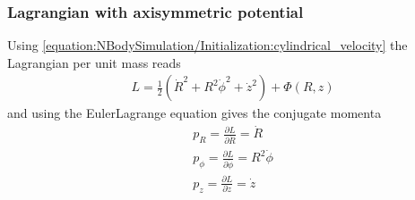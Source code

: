 \documentclass[letterpaper,10pt,english]{sphinxmanual}
\begin{document}
				\subsubsection{Lagrangian with axisymmetric potential}
					\label{\detokenize{NBodySimulation/Initialization:lagrangian-with-axisymmetric-potential}}
					\sphinxAtStartPar
					Using \eqref{equation:NBodySimulation/Initialization:cylindrical_velocity} the Lagrangian per unit mass reads
					\begin{equation*}
					\begin{split}L =\frac{1}{2}\left( \dot{R}^2+R^2\dot{\phi}^2+\dot{z}^2 \right)+\Phi\left(R,z\right)\end{split}
					\end{equation*}
					\sphinxAtStartPar
					and using the Euler\textendash{}Lagrange equation gives the conjugate momenta
					\begin{equation}\label{equation:NBodySimulation/Initialization:conjugate_momenta}
					\begin{split}p_{R} = \frac{\partial L}{\partial \dot{R}} = \dot{R} \\
					 p_{\phi} = \frac{\partial L}{\partial \dot{\phi}} = R^2\dot{\phi} \\
					 p_{z} = \frac{\partial L}{\partial \dot{z}} = \dot{z} \\\end{split}
					\end{equation}
				
\end{document}
